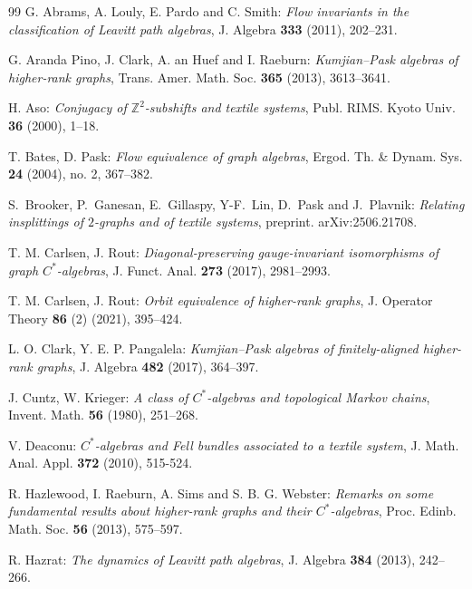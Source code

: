 \documentclass[a4paper,reqno,12pt]{amsart}
\theoremstyle{definition}
\theoremstyle{remark}
\begin{document}
\begin{thebibliography}{99}
G. Abrams, A. Louly, E. Pardo and C. Smith: \emph{Flow invariants in the classification of Leavitt path algebras}, J. Algebra \textbf{333} (2011), 202--231.

G. Aranda Pino, J. Clark, A. an Huef and I. Raeburn: \emph{Kumjian--Pask algebras of higher-rank graphs}, Trans. Amer. Math. Soc. \textbf{365} (2013), 3613--3641.

H. Aso: \emph{Conjugacy of $\mathbb{Z}^2$-subshifts and textile systems}, Publ. RIMS. Kyoto Univ. \textbf{36} (2000), 1--18.

T. Bates, D. Pask: \emph{Flow equivalence of graph algebras}, Ergod. Th. \& Dynam. Sys. \textbf{24} (2004), no. 2, 367--382.

S.\ Brooker, P.\ Ganesan, E.\ Gillaspy, Y-F.\ Lin, D.\ Pask and J.\ Plavnik: \emph{Relating insplittings of $2$-graphs and of textile systems}, preprint. arXiv:2506.21708. 

T. M. Carlsen, J. Rout: \emph{Diagonal-preserving gauge-invariant isomorphisms of graph $C^*$-algebras}, J. Funct. Anal. \textbf{273} (2017), 2981--2993. 


T. M. Carlsen, J. Rout: \emph{Orbit equivalence of higher-rank graphs}, J. Operator Theory \textbf{86} (2) (2021), 395--424.

L. O. Clark, Y. E. P. Pangalela: \emph{Kumjian--Pask algebras of finitely-aligned higher-rank graphs}, J. Algebra \textbf{482} (2017), 364--397.

J. Cuntz, W. Krieger: \emph{A class of $C^*$-algebras and topological Markov chains}, Invent. Math. \textbf{56} (1980), 251--268.

V. Deaconu: \emph{$C^*$-algebras and Fell bundles associated to a textile system}, J. Math. Anal. Appl. \textbf{372} (2010), 515-524.

R. Hazlewood, I. Raeburn, A. Sims and S. B. G. Webster: \emph{Remarks on some fundamental results about higher-rank graphs and their $C^*$-algebras}, Proc. Edinb. Math. Soc. \textbf{56} (2013), 575--597.

R. Hazrat: \emph{The dynamics of Leavitt path algebras}, J. Algebra \textbf{384} (2013), 242--266.


\end{thebibliography}
\end{document}

